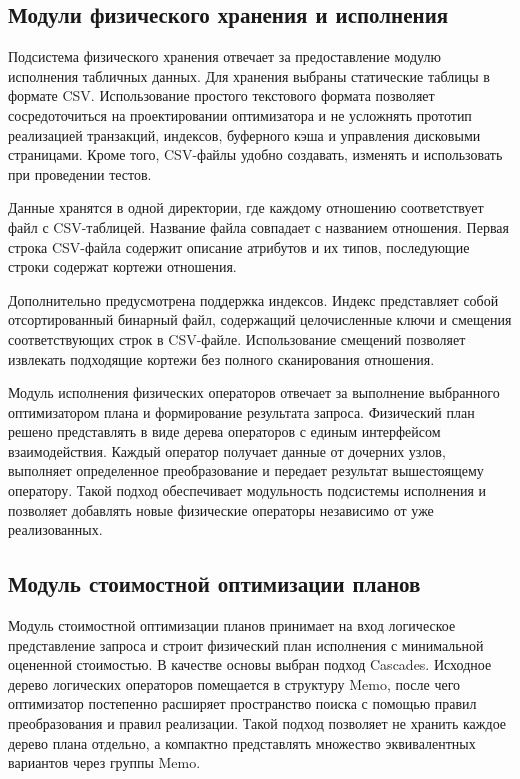 \documentclass[14pt, russian]{scrartcl}
\begin{document}
\subsection{Модули физического хранения и исполнения}

Подсистема физического хранения отвечает за предоставление модулю исполнения
табличных данных. Для хранения выбраны статические таблицы в формате CSV.
Использование простого текстового формата позволяет сосредоточиться на
проектировании оптимизатора и не усложнять прототип реализацией транзакций,
индексов, буферного кэша и управления дисковыми страницами. Кроме того,
CSV-файлы удобно создавать, изменять и использовать при проведении тестов.

Данные хранятся в одной директории, где каждому отношению соответствует
файл с CSV-таблицей. Название файла совпадает с названием отношения.
Первая строка CSV-файла содержит описание атрибутов и их типов,
последующие строки содержат кортежи отношения.

Дополнительно предусмотрена поддержка индексов. Индекс представляет собой
отсортированный бинарный файл, содержащий целочисленные ключи и смещения
соответствующих строк в CSV-файле. Использование смещений позволяет
извлекать подходящие кортежи без полного сканирования отношения.

Модуль исполнения физических операторов отвечает за выполнение выбранного
оптимизатором плана и формирование результата запроса. Физический план решено
представлять в виде дерева операторов с единым интерфейсом взаимодействия.
Каждый оператор получает данные от дочерних узлов, выполняет определенное
преобразование и передает результат вышестоящему оператору. Такой подход
обеспечивает модульность подсистемы исполнения и позволяет добавлять новые
физические операторы независимо от уже реализованных.

\subsection{Модуль стоимостной оптимизации планов}

Модуль стоимостной оптимизации планов принимает на вход логическое представление
запроса и строит физический план исполнения с минимальной оцененной стоимостью.
В качестве основы выбран подход Cascades. Исходное дерево логических операторов
помещается в структуру Memo, после чего оптимизатор постепенно расширяет
пространство поиска с помощью правил преобразования и правил реализации. Такой
подход позволяет не хранить каждое дерево плана отдельно, а компактно
представлять множество эквивалентных вариантов через группы Memo.
\end{document}
